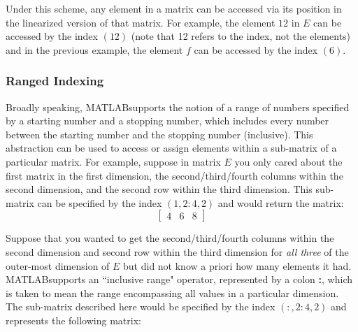 \documentclass[11pt,conference]{IEEEtran}
\newcommand{\matlab}{MATLAB}
\theoremstyle{plain} %
\theoremstyle{definition}
\theoremstyle{remark}
\begin{document}
Under this scheme, any element in a matrix can be accessed via its position in the linearized version of that matrix. For example, the element $12$ in \textbf{$E$} can be accessed by the index $(12)$ (note that 12 refers to the index, not the elements) and in the previous example, the element $f$ can be accessed by the index $(6)$.

\subsubsection{Ranged Indexing} \label{rangedindexing}
Broadly speaking, \matlab\@ supports the notion of a range of numbers specified by a starting number and a stopping number, which includes every number between the starting number and the stopping number (inclusive). This abstraction can be used to access or assign elements within a sub-matrix of a particular matrix. For example, suppose in matrix $E$ you only cared about the first matrix in the first dimension, the second/third/fourth columns within the second dimension, and the second row within the third dimension. This sub-matrix can be specified by the index $(1, 2:4, 2)$ and would return the matrix:
\begin{equation*}
    \begin{bmatrix}
        4 & 6 & 8
    \end{bmatrix}
\end{equation*}

Suppose that you wanted to get the second/third/fourth columns within the second dimension and second row within the third dimension for \textit{all three} of the outer-most dimension of \textbf{$E$} but did not know a priori how many elements it had. \matlab\@ supports an ``inclusive range" operator, represented by a colon \textbf{:}, which is taken to mean the range encompassing all values in a particular dimension. The sub-matrix described here would be specified by the index $(:, 2:4, 2)$ and represents the following matrix:

\begin{figure}[h!]
    \centering

\end{figure}
\end{document}
